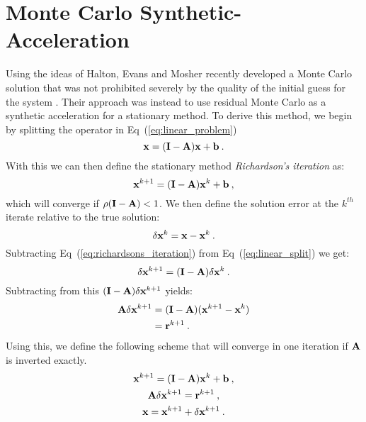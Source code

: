 \section{Monte Carlo Synthetic-Acceleration}
\label{sec:mcsa}
Using the ideas of Halton, Evans and Mosher recently developed a Monte
Carlo solution that was not prohibited severely by the quality of the
initial guess for the system \citep{evans_monte_2009}. Their approach
was instead to use residual Monte Carlo as a synthetic acceleration
for a stationary method. To derive this method, we begin by splitting
the operator in Eq~(\ref{eq:linear_problem})
\begin{equation}
  \mathbf{x} = (\mathbf{I} - \mathbf{A})\mathbf{x} + \mathbf{b}\:.
  \label{eq:linear_split}
\end{equation}
With this we can then define the stationary method
\textit{Richardson's iteration} as:
\begin{equation}
  \mathbf{x}^{k+1} = (\mathbf{I} - \mathbf{A})\mathbf{x}^k + \mathbf{b}\:,
  \label{eq:richardsons_iteration}
\end{equation}
which will converge if $\rho(\mathbf{I} - \mathbf{A}) < 1$. We then define the
solution error at the $k^{th}$ iterate relative to the true solution:
\begin{equation}
  \delta \mathbf{x}^k = \mathbf{x} - \mathbf{x}^k\:.
  \label{eq:mcsa_error}
\end{equation}
Subtracting Eq~(\ref{eq:richardsons_iteration}) from
Eq~(\ref{eq:linear_split}) we get:
\begin{equation}
  \delta \mathbf{x}^{k+1} = (\mathbf{I} - \mathbf{A})\delta \mathbf{x}^k\:.
  \label{eq:mcsa_setup_1}
\end{equation}
Subtracting from this $(\mathbf{I} - \mathbf{A})\delta \mathbf{x}^{k+1}$ yields:
\begin{equation}
  \begin{split}
    \mathbf{A}\delta \mathbf{x}^{k+1} &= (\mathbf{I} -
    \mathbf{A})(\mathbf{x}^{k+1}-\mathbf{x}^{k}) \\ &= \mathbf{r}^{k+1}\:.
    \label{eq:mcsa_setup_2}
  \end{split}
\end{equation}
Using this, we define the following scheme that will converge in one
iteration if $\mathbf{A}$ is inverted exactly.
\begin{subequations}
  \begin{gather}
    \mathbf{x}^{k+1} = (\mathbf{I} - \mathbf{A})\mathbf{x}^k + \mathbf{b}\:,\\
    \mathbf{A} \delta \mathbf{x}^{k+1} = \mathbf{r}^{k+1}\:,\\
    \mathbf{x} = \mathbf{x}^{k+1} + \delta \mathbf{x}^{k+1}\:.
  \end{gather}
  \label{eq:mcsa_setup_3}
\end{subequations}
